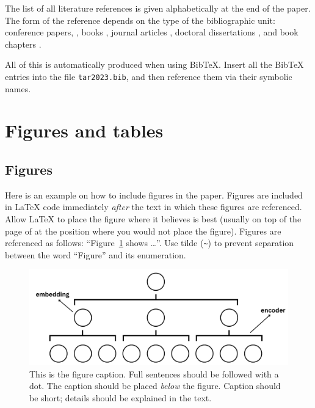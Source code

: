 \documentclass[10pt, a4paper]{article}
\begin{document}
The list of all literature references is given alphabetically at the end of the paper. The form of the reference depends on the type of the bibliographic unit: conference papers,
\citep{chave-64}, books \citep{butcher-81}, journal articles
\citep{howells-51}, doctoral dissertations \citep{croft-78}, and book chapters \citep{feigl-58}. 

All of this is automatically produced when using BibTeX. Insert all the BibTeX entries into the file \texttt{tar2023.bib}, and then reference them via their symbolic names.

\section{Figures and tables}

\subsection{Figures}

Here is an example on how to include figures in the paper. Figures are included in \LaTeX{} code immediately \textit{after} the text in which these figures are referenced. Allow \LaTeX{} to place the figure where it believes is best (usually on top of the page of at the position where you would not place the figure). Figures are referenced as follows: ``Figure~\ref{fig:figure1} shows \dots''. Use tilde (\verb.~.) to prevent separation between the word ``Figure'' and its enumeration. 

\begin{figure}
\begin{center}
\includegraphics[width=\columnwidth]{images/RTransformer.png}
\caption{This is the figure caption. Full sentences should be followed with a dot. The caption should be placed \textit{below} the figure. Caption should be short; details should be explained in the text.}
\label{fig:figure1}
\end{center}
\end{figure}
\end{document}
